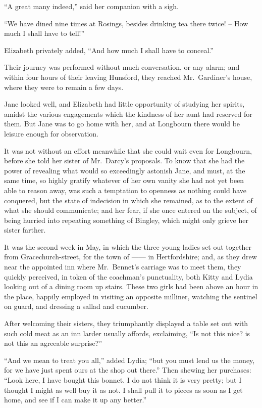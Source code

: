 “A great many indeed,” said her companion with
a sigh.

“We have dined nine times at Rosings, besides drinking
tea there twice! -- How much I shall have to tell!”

Elizabeth privately added, “And how much I shall
have to conceal.”

Their journey was performed without much conversation,
or any alarm; and within four hours of their
leaving Hunsford, they reached Mr.\ Gardiner’s house,
where they were to remain a few days.

Jane looked well, and Elizabeth had little opportunity
of studying her spirits, amidst the various engagements
which the kindness of her aunt had reserved for them.
But Jane was to go home with her, and at Longbourn
there would be leisure enough for observation.

It was not without an effort meanwhile that she could
wait even for Longbourn, before she told her sister of
Mr.\ Darcy’s proposals. To know that she had the power
of revealing what would so exceedingly astonish Jane,
and must, at the same time, so highly gratify whatever
of her own vanity she had not yet been able to reason
away, was such a temptation to openness as nothing could
have conquered, but the state of indecision in which she
remained, as to the extent of what she should communicate;
and her fear, if she once entered on the subject, of
being hurried into repeating something of Bingley, which
might only grieve her sister farther.


It was the second week in May, in which the three
young ladies set out together from Gracechurch-street, for
the town of ------ in Hertfordshire; and, as they drew
near the appointed inn where Mr.\ Bennet’s carriage was
to meet them, they quickly perceived, in token of the
coachman’s punctuality, both Kitty and Lydia looking
out of a dining room up stairs. These two girls had been
above an hour in the place, happily employed in visiting
an opposite milliner, watching the sentinel on guard, and
dressing a sallad and cucumber.

After welcoming their sisters, they triumphantly displayed
a table set out with such cold meat as an inn larder
usually affords, exclaiming, “Is not this nice? is not
this an agreeable surprise?”

“And we mean to treat you all,” added Lydia; “but
you must lend us the money, for we have just spent ours
at the shop out there.” Then shewing her purchases:
“Look here, I have bought this bonnet. I do not think
it is very pretty; but I thought I might as well buy it
as not. I shall pull it to pieces as soon as I get home,
and see if I can make it up any better.”


